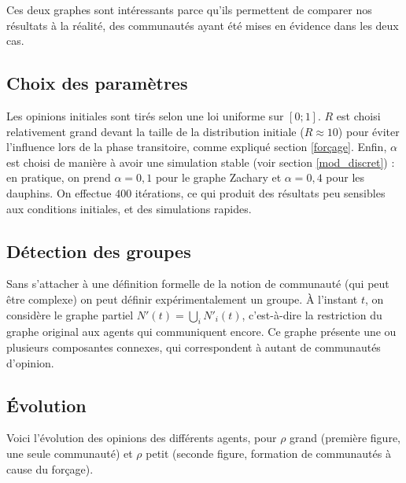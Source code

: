 \documentclass[12pt]{article}
\begin{document}
Ces deux graphes sont intéressants parce qu'ils permettent de comparer
nos résultats à la réalité, des communautés ayant été mises en
évidence dans les deux cas.

\subsection{Choix des paramètres}
Les opinions initiales sont tirés selon une loi uniforme sur $[0; 1]$.
$R$ est choisi relativement grand devant la taille de la distribution
initiale ($R\approx10$) pour éviter l'influence lors de la phase
transitoire, comme expliqué section \ref{forçage}. Enfin, $\alpha$ est
choisi de manière à avoir une simulation stable (voir section
\ref{mod_discret}) : en pratique, on prend $\alpha = 0,1$ pour le
graphe Zachary et $\alpha = 0,4$ pour les dauphins. On effectue $400$
itérations, ce qui produit des résultats peu sensibles aux conditions
initiales, et des simulations rapides.

\subsection{Détection des groupes}
Sans s'attacher à une définition formelle de la notion de communauté
(qui peut être complexe) on peut définir expérimentalement un
groupe. À l'instant $t$, on considère le graphe partiel $N'(t) =
\bigcup_i N'_i(t)$, c'est-à-dire la restriction du graphe original aux
agents qui communiquent encore. Ce graphe présente une ou plusieurs
composantes connexes, qui correspondent à autant de communautés
d'opinion.

\subsection{Évolution}

Voici l'évolution des opinions des différents agents, pour $\rho$
grand (première figure, une seule communauté) et $\rho$ petit (seconde
figure, formation de communautés à cause du forçage).
\end{document}
